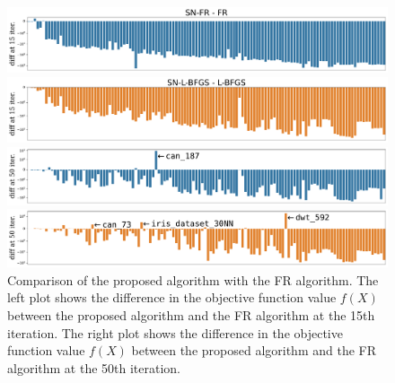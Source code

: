 \documentclass[dvipdfmx,journal]{IEEEtran}
\begin{document}
\begin{figure}[t]
    \centering
    \begin{minipage}{\columnwidth}
        \centering
        \includegraphics[width=\columnwidth]{overall/plot/diff_FR_15.pdf}
    \end{minipage}
    \begin{minipage}{\columnwidth}
        \centering
        \includegraphics[width=\columnwidth]{overall/plot/diff_L-BFGS_15.pdf}
    \end{minipage}
    \begin{minipage}{\columnwidth}
        \centering
        \includegraphics[width=\columnwidth]{overall/plot/diff_FR_50.pdf}
    \end{minipage}
    \begin{minipage}{\columnwidth}
        \centering
        \includegraphics[width=\columnwidth]{overall/plot/diff_L-BFGS_50.pdf}
    \end{minipage}
    \caption{
        Comparison of the proposed algorithm with the FR algorithm.
        The left plot shows the difference in the objective function value $f(X)$ between the proposed algorithm and the FR algorithm at the 15th iteration.
        The right plot shows the difference in the objective function value $f(X)$ between the proposed algorithm and the FR algorithm at the 50th iteration.
    }
    \label{fig:diff_L_BFGS}
\end{figure}
\end{document}
